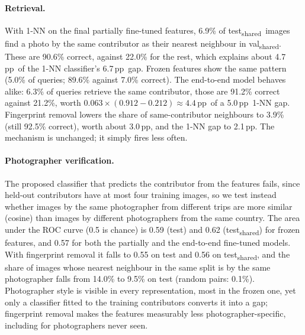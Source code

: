 \documentclass[clean,twocolumn]{bam-project}
\newcommand{\tsh}{test\textsubscript{shared}}
\newcommand{\vsh}{val\textsubscript{shared}}
\newcommand{\pp}{\,pp}
\begin{document}
\paragraph{Retrieval.} With 1-NN on the final partially fine-tuned features, 6.9\% of \tsh\ images find a
photo by the same contributor as their nearest neighbour in \vsh. These are 90.6\% correct, against
22.0\% for the rest, which explains about 4.7\pp\ of the 1-NN classifier's 6.7\pp\ gap. Frozen features
show the same pattern (5.0\% of queries; 89.6\% against 7.0\% correct). The end-to-end model behaves
alike: 6.3\% of queries retrieve the same contributor, those are 91.2\% correct against 21.2\%, worth
$0.063\times(0.912-0.212)\approx4.4$\pp\ of a 5.0\pp\ 1-NN gap. Fingerprint removal lowers the share of
same-contributor neighbours to 3.9\% (still 92.5\% correct), worth about 3.0\pp, and the 1-NN gap to
2.1\pp. The mechanism is unchanged; it simply fires less often.

\paragraph{Photographer verification.} The proposed classifier that predicts the contributor from the
features fails, since held-out contributors have at most four training images, so we test instead
whether images by the same photographer from different trips are more similar (cosine) than images by
different photographers from the same country. The area under the ROC curve (0.5 is chance) is 0.59
(test) and 0.62 (\tsh) for frozen features, and 0.57 for both the partially and the end-to-end
fine-tuned models. With fingerprint removal it falls to 0.55 on test and 0.56 on \tsh, and the share of
images whose nearest neighbour in the same split is by the same photographer falls from 14.0\% to 9.5\% on
test (random pairs: 0.1\%). Photographer style is visible in every representation, most in the frozen one,
yet only a classifier fitted to the training contributors converts it into a gap; fingerprint removal
makes the features measurably less photographer-specific, including for photographers never seen.
\end{document}
